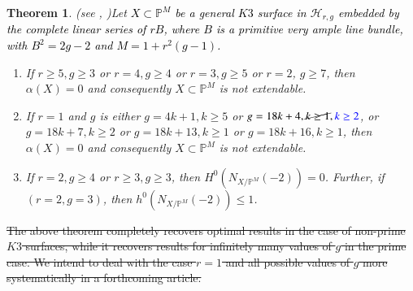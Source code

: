 \documentclass[11pt,twoside]{amsart}
\theoremstyle{plain}
\numberwithin{equation}{section}
\newtheorem{theorem}{Theorem}[section]
\theoremstyle{definition}
\begin{document}
\begin{theorem}(see , )\label{non-extendability of K3 surfaces intro}
    Let \textcolor{black}{$X \subset \mathbb{P}^{M}$ be a general $K3$ surface in $\mathcal{H}_{r,g}$ embedded by the complete linear series of $rB$, where $B$ is a primitive very ample line bundle, with $B^2 = 2g-2$ and $M = 1+r^2(g-1)$.}
    
    \begin{enumerate}
        \item If $r \geq 5, g \geq 3$ or $r = 4, g \geq 4$ or $r = 3, g \geq 5$ or $r = 2$, $g \geq 7$, then $\alpha(X) = 0$ and consequently $X \subset \mathbb{P}^M$ is not extendable. 

       
        \item If $r = 1$ and $g$ is either $g = 4k+1, k \geq 5$ or $g = 18k+4, \cancel{k \geq 1}, \textcolor{blue}{k \geq 2}$, or $g = 18k+7, k \geq 2$ or $g = 18k+13, k \geq 1$ or $g = 18k+16, k \geq 1$, then $\alpha(X) = 0$ and consequently $X \subset \mathbb{P}^M$ is not extendable.
        
        \item[(3)] If $r = 2, g \geq 4$ or $r \geq 3, g \geq 3$, then $H^0(N_{X/\mathbb{P}^M}(-2)) = 0$. Further, if $(r = 2, g = 3)$, then $h^0(N_{X/\mathbb{P}^M}(-2)) \leq 1$.
        
        
    \end{enumerate}
\end{theorem}

 \par

\sout{The above theorem completely recovers optimal results in the case of non-prime $K3$ surfaces, while it recovers results for infinitely many values of $g$ in the prime case. We intend to deal with the case $r = 1$ and all possible values of $g$ more systematically in a forthcoming article. }

\vspace{0.2cm}

\color{black}

\end{document}
